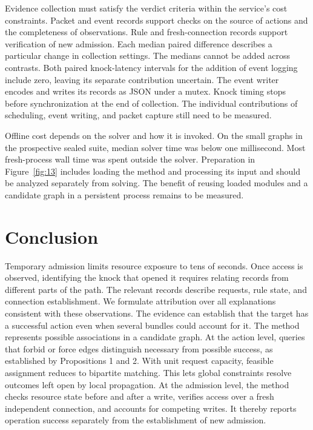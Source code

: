 Evidence collection must satisfy the verdict criteria within the service's cost constraints. Packet and event records support checks on the source of actions and the completeness of observations. Rule and fresh-connection records support verification of new admission. Each median paired difference describes a particular change in collection settings. The medians cannot be added across contrasts. Both paired knock-latency intervals for the addition of event logging include zero, leaving its separate contribution uncertain. The event writer encodes and writes its records as JSON under a mutex. Knock timing stops before synchronization at the end of collection. The individual contributions of scheduling, event writing, and packet capture still need to be measured.

Offline cost depends on the solver and how it is invoked. On the small graphs in the prospective sealed suite, median solver time was below one millisecond. Most fresh-process wall time was spent outside the solver. Preparation in Figure~\ref{fig:13} includes loading the method and processing its input and should be analyzed separately from solving. The benefit of reusing loaded modules and a candidate graph in a persistent process remains to be measured.

\section{Conclusion}\label{conclusion}

Temporary admission limits resource exposure to tens of seconds. Once access is observed, identifying the knock that opened it requires relating records from different parts of the path. The relevant records describe requests, rule state, and connection establishment. We formulate attribution over all explanations consistent with these observations. The evidence can establish that the target has a successful action even when several bundles could account for it. The method represents possible associations in a candidate graph. At the action level, queries that forbid or force edges distinguish necessary from possible success, as established by Propositions 1 and 2. With unit request capacity, feasible assignment reduces to bipartite matching. This lets global constraints resolve outcomes left open by local propagation. At the admission level, the method checks resource state before and after a write, verifies access over a fresh independent connection, and accounts for competing writes. It thereby reports operation success separately from the establishment of new admission.

